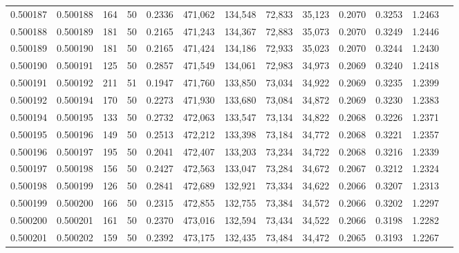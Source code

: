 \begin{tabular}{rrrrrrrrrrrrr}
0.500187 & 0.500188 & 164 &  50 &                                     0.2336 & 471,062 & 134,548 &  72,833 &  35,123 & 0.2070 & 0.3253 & 1.2463 \\
0.500188 & 0.500189 & 181 &  50 &                                     0.2165 & 471,243 & 134,367 &  72,883 &  35,073 & 0.2070 & 0.3249 & 1.2446 \\
0.500189 & 0.500190 & 181 &  50 &                                     0.2165 & 471,424 & 134,186 &  72,933 &  35,023 & 0.2070 & 0.3244 & 1.2430 \\
0.500190 & 0.500191 & 125 &  50 &                                     0.2857 & 471,549 & 134,061 &  72,983 &  34,973 & 0.2069 & 0.3240 & 1.2418 \\
0.500191 & 0.500192 & 211 &  51 &                                     0.1947 & 471,760 & 133,850 &  73,034 &  34,922 & 0.2069 & 0.3235 & 1.2399 \\
0.500192 & 0.500194 & 170 &  50 &                                     0.2273 & 471,930 & 133,680 &  73,084 &  34,872 & 0.2069 & 0.3230 & 1.2383 \\
0.500194 & 0.500195 & 133 &  50 &                                     0.2732 & 472,063 & 133,547 &  73,134 &  34,822 & 0.2068 & 0.3226 & 1.2371 \\
0.500195 & 0.500196 & 149 &  50 &                                     0.2513 & 472,212 & 133,398 &  73,184 &  34,772 & 0.2068 & 0.3221 & 1.2357 \\
0.500196 & 0.500197 & 195 &  50 &                                     0.2041 & 472,407 & 133,203 &  73,234 &  34,722 & 0.2068 & 0.3216 & 1.2339 \\
0.500197 & 0.500198 & 156 &  50 &                                     0.2427 & 472,563 & 133,047 &  73,284 &  34,672 & 0.2067 & 0.3212 & 1.2324 \\
0.500198 & 0.500199 & 126 &  50 &                                     0.2841 & 472,689 & 132,921 &  73,334 &  34,622 & 0.2066 & 0.3207 & 1.2313 \\
0.500199 & 0.500200 & 166 &  50 &                                     0.2315 & 472,855 & 132,755 &  73,384 &  34,572 & 0.2066 & 0.3202 & 1.2297 \\
0.500200 & 0.500201 & 161 &  50 &                                     0.2370 & 473,016 & 132,594 &  73,434 &  34,522 & 0.2066 & 0.3198 & 1.2282 \\
0.500201 & 0.500202 & 159 &  50 &                                     0.2392 & 473,175 & 132,435 &  73,484 &  34,472 & 0.2065 & 0.3193 & 1.2267 \\

\end{tabular}
